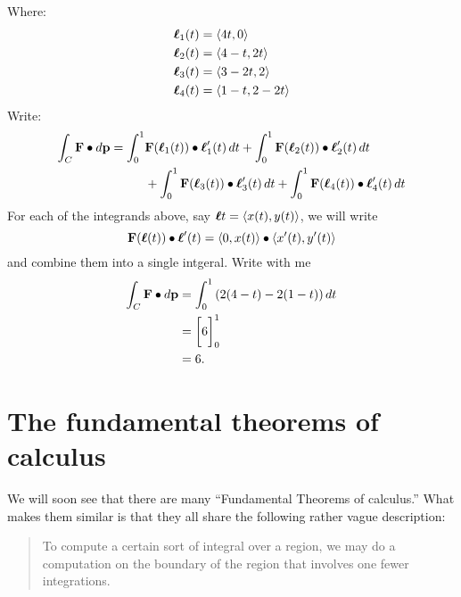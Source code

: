 \documentclass{ximera}
\begin{document}
\begin{example}
\begin{explanation}
\begin{image}
    \end{image}
    Where:
    \begin{align*}
      \boldsymbol{\ell}_1(t) &= \left\langle 4t,0\right\rangle\\
      \boldsymbol{\ell}_2(t) &= \left\langle 4-t,2t\right\rangle\\
      \boldsymbol{\ell}_3(t) &= \left\langle 3-2t,2\right\rangle\\
      \boldsymbol{\ell}_4(t) &= \left\langle 1-t,2-2t\right\rangle
    \end{align*}
    Write:
    \begin{align*}
    \int_C \mathbf{F}\bullet\mathop{}\!d\mathbf{p} = \int_0^1 &\mathbf{F}(\boldsymbol{\ell}_1(t))\bullet \boldsymbol{\ell}_1'(t) \mathop{}\!d t
    + \int_0^1 \mathbf{F}(\boldsymbol{\ell}_2(t))\bullet \boldsymbol{\ell}_2'(t) \mathop{}\!d t\\
    &+ \int_0^1 \mathbf{F}(\boldsymbol{\ell}_3(t))\bullet \boldsymbol{\ell}_3'(t) \mathop{}\!d t
    + \int_0^1 \mathbf{F}(\boldsymbol{\ell}_4(t))\bullet \boldsymbol{\ell}_4'(t) \mathop{}\!d t
    \end{align*}
    For each of the integrands above, say $\boldsymbol{\ell}{t} =
    \left\langle x(t),y(t)\right\rangle$, we will write
    \[
    \mathbf{F}(\boldsymbol{\ell}(t))\bullet \boldsymbol{\ell}'(t) = \left\langle 0,x(t)\right\rangle \bullet \left\langle x'(t),y'(t)\right\rangle
    \]
    and combine them into a single intgeral. Write with me
    \begin{align*}
      \int_C \mathbf{F}\bullet\mathop{}\!d\mathbf{p} &= \int_0^1 \left(2(4-t) -2(1-t) \right)\mathop{}\!d t\\
      &= \bigg[ 6 \bigg]_0^1\\
      &= 6. 
    \end{align*}
  \end{explanation}
\end{example}



\section{The fundamental theorems of calculus}


We will soon see that there are many ``Fundamental Theorems of
calculus.'' What makes them similar is that they all share the
following rather vague description:
\begin{quote}
  To compute a certain sort of integral over a region, we may do a
  computation on the boundary of the region that involves one fewer
  integrations.
\end{quote}
\end{document}
